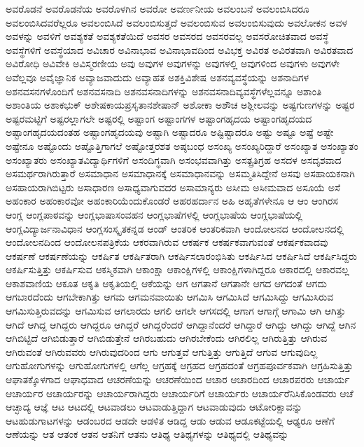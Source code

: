 {ಅವರೊಡನೆ
ಅವರೊಡನೆಯ
ಅವರೊಳಗಿನ
ಅವರೋ
ಅವರ್ಣನೀಯ
ಅವಲಂಬನೆ
ಅವಲಂಬಿಸಿದರೂ
ಅವಲಂಬಿಸಿದವರೆಲ್ಲರೂ
ಅವಲಂಬಿಸಿದೆ
ಅವಲಂಬಿಸುತ್ತದೆ
ಅವಲಂಬಿಸುವ
ಅವಲಂಬಿಸುವುದು
ಅವಲೋಕನ
ಅವಳ
ಅವಳನ್ನು
ಅವಳಿಗೆ
ಅವಶ್ಯಕತೆ
ಅವಶ್ಯಕತೆಯಿದೆ
ಅವಸರ
ಅವಸರದ
ಅವಸರವಲ್ಲ
ಅವಸರೋಚಿತವಾದ
ಅವಸ್ಥೆ
ಅವಸ್ಥೆಗಳಿಗೆ
ಅವಸ್ಥೆಯಾದ
ಅವಿಚಾರ
ಅವಿನಾಭಾವ
ಅವಿನಾಭಾವದಿಂದ
ಅವಿಭಕ್ತ
ಅವಿರತ
ಅವಿರತವಾಗಿ
ಅವಿರತವಾದ
ಅವಿರೋಧಿ
ಅವಿವೇಕಿ
ಅವಿಸ್ಮರಣೀಯ
ಅವು
ಅವುಗಳ
ಅವುಗಳನ್ನು
ಅವುಗಳಲ್ಲಿ
ಅವುಗಳಿಂದ
ಅವುಗಳು
ಅವುಗಳೇ
ಅವೆಲ್ಲವೂ
ಅವೈಜ್ಞಾನಿಕ
ಅವ್ಯಾಜವಾದುದು
ಅವ್ಯಾಹತ
ಅಶಕ್ತಿವಿಶೇಷ
ಅಶನವ್ಯವಸ್ಥೆಯನ್ನು
ಅಶನಾದಿಗಳ
ಅಶನವಸನಗಳೊಂದಿಗೆ
ಅಶನವಸನಾದಿ
ಅಶನವಸನಾದಿಗಳನ್ನು
ಅಶನವಸನಾದಿವ್ಯವಸ್ಥೆಗಳೆಲ್ಲವನ್ನೂ
ಅಶಾಂತಿ
ಅಶಾಂತಿಯ
ಅಶಾಕಭುಕ್
ಅಶೇಷಕಾಯಪ್ರಸೃತಾನಶೇಷಾನ್
ಅಶೋಕಾ
ಅಶೌಚ
ಅಶ್ಲೀಲವನ್ನು
ಅಷ್ಟಗುಣಗಳನ್ನು
ಅಷ್ಟರ
ಅಷ್ಟರಮಟ್ಟಿಗೆ
ಅಷ್ಟರಲ್ಲಾಗಲೇ
ಅಷ್ಟರಲ್ಲಿ
ಅಷ್ಟಾಂಗ
ಅಷ್ಟಾಂಗಗಳ
ಅಷ್ಟಾಂಗಹೃದಯ
ಅಷ್ಟಾಂಗಹೃದಯದ
ಅಷ್ಟಾಂಗಹೃದಯದಂತಹ
ಅಷ್ಟಾಂಗಹೃದಯವು
ಅಷ್ಟಾಗಿ
ಅಷ್ಟಾದರೂ
ಅಷ್ಟಿಷ್ಟಾದರೂ
ಅಷ್ಟು
ಅಷ್ಟೂ
ಅಷ್ಟೆ
ಅಷ್ಟೇ
ಅಷ್ಟೇನೂ
ಅಷ್ಟೊಂದು
ಅಷ್ಟೊತ್ತಿಗಾಗಲೆ
ಅಷ್ಟೋತ್ತರಶತ
ಅಷ್ಠಬಂಧ
ಅಸಂಖ್ಯ
ಅಸಂಖ್ಯರಿದ್ದಾರೆ
ಅಸಂಖ್ಯಾತ
ಅಸಂಖ್ಯಾತಂ
ಅಸಂಖ್ಯಾತರು
ಅಸಂಖ್ಯಾತವಿದ್ಯಾರ್ಥಿಗಳಿಗೆ
ಅಸಂದಿಗ್ಧವಾಗಿ
ಅಸಂಭವವಾಗಿತ್ತು
ಅಸತ್ಪ್ರತಿಗ್ರಹ
ಅಸದಳ
ಅಸದೃಶವಾದ
ಅಸಮರ್ಥರಾಗಿರುತ್ತಾರೆ
ಅಸಮಾಧಾನ
ಅಸಮಾಧಾನಕ್ಕೆ
ಅಸಮಾಧಾನವನ್ನು
ಅಸಮ್ಮತಿಸಿದ್ದೇನೆ
ಅಸವು
ಅಸಹಾಯಕನಾಗಿ
ಅಸಹಾಯರಾಗಿಬಿಟ್ಟರು
ಅಸಾಧಾರಣ
ಅಸಾಧ್ಯವಾಗುವದರ
ಅಸಾಮಾನ್ಯರು
ಅಸೀಮ
ಅಸೀಮವಾದ
ಅಸೂಯೆ
ಅಸೆ
ಅಹಂಕಾರ
ಅಹಂಕಾರವೋ
ಅಹಂಕಾರಿಯೆಂದುಕೊಂಡರೆ
ಅಹರಹರ್ದಾನ
ಅಹಿ
ಅಹೃತೆಗಳೇನೂ
ಆ
ಆಂ
ಆಂಗಿರಸ
ಆಂಗ್ಲ
ಆಂಗ್ಲಪಾಠವನ್ನು
ಆಂಗ್ಲಭಾಷಾಸಂವಹನ
ಆಂಗ್ಲಭಾಷೆಗಳಲ್ಲಿ
ಆಂಗ್ಲಭಾಷೆಯ
ಆಂಗ್ಲಭಾಷೆಯಲ್ಲಿ
ಆಂಗ್ಲವಿದ್ಯಾರ್ಜನಾವಿಧಾನ
ಆಂಗ್ಲಸಂಸ್ಕೃತಕನ್ನಡ
ಆಂಡ್
ಆಂತರಿಕ
ಆಂತರಿಕವಾಗಿ
ಆಂದೋಲನದ
ಆಂದೋಲನದಲ್ಲಿ
ಆಂದೋಲನದಿಂದ
ಆಂದೋಲನಪತ್ರಿಕೆಯ
ಆಕರವಾಗಿರುವ
ಆಕರ್ಷಕ
ಆಕರ್ಷಕವಾಗುವಂತೆ
ಆಕರ್ಷಕವಾದವು
ಆಕರ್ಷಣೆ
ಆಕರ್ಷಣೆಯನ್ನು
ಆಕರ್ಷಿತ
ಆಕರ್ಷಿತರಾಗಿ
ಆಕರ್ಷಿಸಲಾರಂಭಿಸಿತು
ಆಕರ್ಷಿಸಿದ
ಆಕರ್ಷಿಸಿದೆ
ಆಕರ್ಷಿಸಿದ್ದರು
ಆಕರ್ಷಿಸುತ್ತಿತ್ತು
ಆಕರ್ಷಿಸುವ
ಆಕಸ್ಮಿಕವಾಗಿ
ಆಕಾಂಕ್ಷಾ
ಆಕಾಂಕ್ಷಿಗಳಲ್ಲಿ
ಆಕಾಂಕ್ಷಿಗಳಾಗಿದ್ದರೂ
ಆಕಾರದಲ್ಲಿ
ಆಕಾರವಲ್ಲ
ಆಕಾಶವಾಣಿಯ
ಆಕೂತ
ಆಕೃತಿ
ಆಕೃತಿಯಲ್ಲಿ
ಆಕೆಯನ್ನು
ಆಗ
ಆಗತಾನೆ
ಆಗತಾನೇ
ಆಗದ
ಆಗದಂತೆ
ಆಗದು
ಆಗಬಾರದೆಂದು
ಆಗಬೇಕಾಗಿತ್ತು
ಆಗಮ
ಆಗಮನವಾಯಿತು
ಆಗಮಿಸಿ
ಆಗಮಿಸಿದೆ
ಆಗಮಿಸಿದ್ದು
ಆಗಮಿಸಿರುವ
ಆಗಮಿಸುತ್ತಿರುವದನ್ನು
ಆಗಮಿಸುವ
ಆಗಲಾರದು
ಆಗಲಿ
ಆಗಲೇ
ಆಗಸದಲ್ಲಿ
ಆಗಾಗ
ಆಗಾಗ್ಗೆ
ಆಗಾಮಿ
ಆಗಿ
ಆಗಿತ್ತು
ಆಗಿದೆ
ಆಗಿದ್ದ
ಆಗಿದ್ದರು
ಆಗಿದ್ದರೂ
ಆಗಿದ್ದರೆ
ಆಗಿದ್ದರೆಂದರೆ
ಆಗಿದ್ದಾನೆಂದರೆ
ಆಗಿದ್ದಾರೆ
ಆಗಿದ್ದು
ಆಗಿದ್ದು
ಆಗಿದ್ದೆ
ಆಗಿನ
ಆಗಿಬಿಟ್ಟಿದೆ
ಆಗಿಬಿಡುತ್ತಾರೆ
ಆಗಿಬಿಡುತ್ತೇನೆ
ಆಗಿರಬಹುದು
ಆಗಿರಬೇಕೆಂದು
ಆಗಿರಲಿಲ್ಲ
ಆಗಿರುತ್ತಿತ್ತು
ಆಗಿರುವ
ಆಗಿರುವಂತೆ
ಆಗಿರುವವರು
ಆಗಿರುವುದರಿಂದ
ಆಗು
ಆಗುತ್ತವೆ
ಆಗುತ್ತಿತ್ತು
ಆಗುತ್ತಿದೆ
ಆಗುವ
ಆಗುವುದಿಲ್ಲ
ಆಗುಹೋಗುಗಳನ್ನು
ಆಗುಹೋಗುಗಳಲ್ಲಿ
ಆಗೆಲ್ಲ
ಆಗ್ರಹಕ್ಕೆ
ಆಗ್ರಹದ
ಆಗ್ರಹದಂತೆ
ಆಗ್ರಹಪೂರ್ವಕವಾಗಿ
ಆಗ್ರಹಿಸುತ್ತಿತ್ತು
ಆಘಾತಕ್ಕೊಳಗಾದ
ಆಘಾಧವಾದ
ಆಚರಣೆಯನ್ನು
ಆಚರಣೆಯಿಂದ
ಆಚಾರ
ಆಚಾರದಿಂದ
ಆಚಾರಪರರು
ಆಚಾರ್ಯ
ಆಚಾರ್ಯರ
ಆಚಾರ್ಯರನ್ನು
ಆಚಾರ್ಯರಾಗಿದ್ದರು
ಆಚಾರ್ಯರಿಗೆ
ಆಚಾರ್ಯರು
ಆಚಾರ್ಯರೆನಿಸಿಕೊಂಡವರು
ಆಚೆ
ಆಚ್ಛಾದ್ಯ
ಆಜ್ಞೆ
ಆಟ
ಆಟದಲ್ಲಿ
ಆಟವಾಡಲು
ಆಟವಾಡುತ್ತಿದ್ದಾಗ
ಆಟವಾಡುವುದು
ಆಟೋರಿಕ್ಷಾವನ್ನು
ಆಟಹುಡುಗಾಟಗಳನ್ನು
ಆಡಂಬರದ
ಆಡದೇ
ಆಡಳಿತ
ಆಡಿದ್ದ
ಆಡು
ಆಡುವ
ಆಡೂಕಟ್ಟೆಯಲ್ಲಿ
ಆಢ್ಯರೂ
ಆಣೆಗೆ
ಆಣೆಯನ್ನು
ಆತ
ಆತಂಕ
ಆತನ
ಆತನಿಗೆ
ಆತನು
ಆತಿಥ್ಯ
ಆತಿಥ್ಯಗಳನ್ನು
ಆತಿಥ್ಯದಲ್ಲಿ
ಆತಿಥ್ಯವನ್ನು
}
